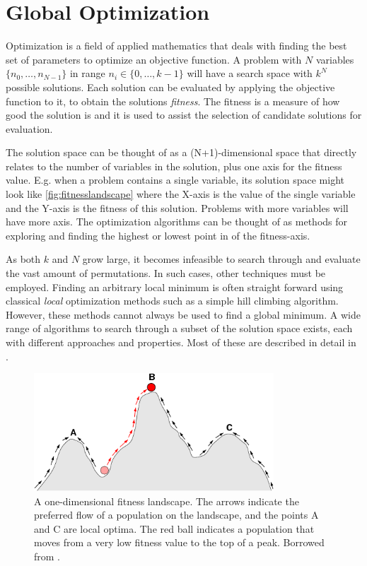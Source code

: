 \section{Global Optimization}

Optimization is a field of applied mathematics that deals with finding the best
set of parameters to optimize an objective function. A problem with $N$
variables $\{n_0, \dots, n_{N-1}\}$ in range $n_i \in \{0, \dots, k-1\}$ will
have a search space with $k^N$ possible solutions. Each solution can be
evaluated by applying the objective function to it, to obtain the solutions
\emph{fitness}. The fitness is a measure of how good the solution is and it is
used to assist the selection of candidate solutions for evaluation.

The solution space can be thought of as a (N+1)-dimensional space that directly
relates to the number of variables in the solution, plus one axis for the
fitness value. E.g. when a problem contains a single variable, its solution
space might look like \autoref{fig:fitnesslandscape} where the X-axis is the
value of the single variable and the Y-axis is the fitness of this solution.
Problems with more variables will have more axis. The optimization algorithms
can be thought of as methods for exploring and finding the highest or lowest
point in of the fitness-axis.

As both $k$ and $N$ grow large, it becomes infeasible to search through and
evaluate the vast amount of permutations. In such cases, other techniques must
be employed. Finding an arbitrary local minimum is often straight forward using
classical \emph{local} optimization methods such as a simple hill climbing
algorithm. However, these methods cannot always be used to find a global
minimum. A wide range of algorithms to search through a subset of the solution
space exists, each with different approaches and properties. Most of these are
described in detail in \cite{russellnorvig}.

\begin{figure}[bth]
    \centering
    \includegraphics[width=0.8\textwidth]{figs/Fitness-landscape-cartoon.png}
    \caption{A one-dimensional fitness landscape. The arrows indicate the
        preferred flow of a population on the landscape, and the points A and C
        are local optima. The red ball indicates a population that moves from a
        very low fitness value to the top of a peak. Borrowed from \cite{wikifitnesslandscape}.}
    \label{fig:fitnesslandscape}
\end{figure}

